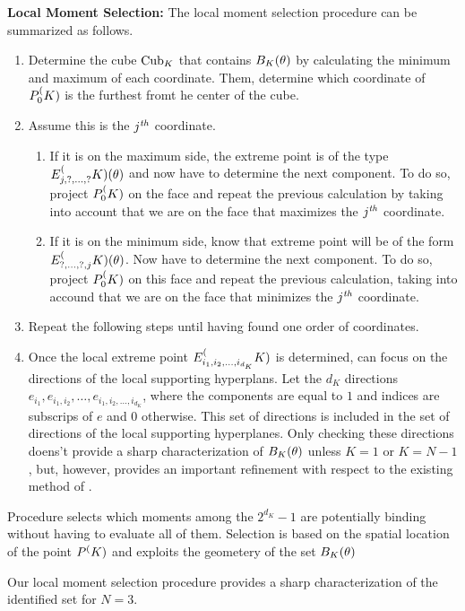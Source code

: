\textbf{Local Moment Selection:} The local moment selection procedure can be summarized as follows.
\begin{enumerate}
	\item Determine the cube $\operatorname{Cub}_K$ that contains $B_K(\theta)$ by calculating the minimum and maximum of each coordinate. Them, determine which coordinate of $P_0^(K)$ is the furthest fromt he center of the cube. 

	\item Assume this is the $j^{\text{\emph{th}}}$ coordinate.
	\begin{enumerate}
		\item If it is on the maximum side, the extreme point is of the type $E_{j,?, \dots, ?}^(K)(\theta)$ and now have to determine the next component. To do so, project $P_0^(K)$ on the face and repeat the previous calculation by taking into account that we are on the face that maximizes the $j^{\text{\emph{th}}}$ coordinate.
		\item If it is on the minimum side, know that extreme point will be of the form $E_{?,\dots, ?, j}^(K)(\theta)$. Now have to determine the next component. To do so, project $P_0^(K)$ on this face and repeat the previous calculation, taking into accound that we are on the face that minimizes the $j^{\text{\emph{th}}}$ coordinate. 
	\end{enumerate}
	\item Repeat the following steps until having found one order of coordinates. 
	\item Once the local extreme point $E_{i_1, i_2, \dots, i_{d_K}}^(K)$ is determined, can focus on the directions of the local supporting hyperplans. Let the $d_K$ directions $e_{i_1}, e_{i_1, i_2}, \dots, e_{{i_1}, {i_2}, \dots, i_{d_K}}$, where the components are equal to $1$ and indices are subscrips of $e$ and $0$ otherwise. This set of directions is included in the set of directions of the local supporting hyperplanes. Only checking these directions doens't provide a sharp characterization of $B_K(\theta)$ unless $K= 1$ or $K = N-1$, but, however, provides an important refinement with respect to the existing method of \citet{CT-2009}.
\end{enumerate}

Procedure selects which moments among the $2^{d_K} - 1$ are potentially binding without having to evaluate all of them. Selection is based on the spatial location of the point $P^(K)$ and exploits the geometery of the set $B_K(\theta)$

\begin{prop}
	\label{prop:BK-8} Our local moment selection procedure provides a sharp characterization of the identified set for $N=3$. 
\end{prop}

